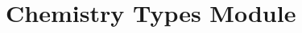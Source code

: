 \documentclass[12pt]{article}
\newcommand{\header}[1]{
    \section*{#1 Module}
}
\newenvironment{module}{\newpage}{}
\begin{document}
\begin{module}
    \header{Chemistry Types}
\end{module}
\end{document}
